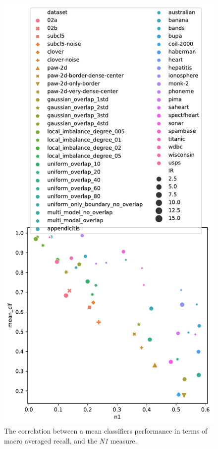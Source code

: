 \begin{figure}[tb]
\centering
\includegraphics[width=0.8\columnwidth]{plots/dataset_plots/siam_full_plot_n1.pdf}
\caption{The correlation between a mean classifiers performance in terms of macro averaged recall, and the \emph{N1} measure.}
\label{fig:n1_dataset_plot}
\end{figure}
